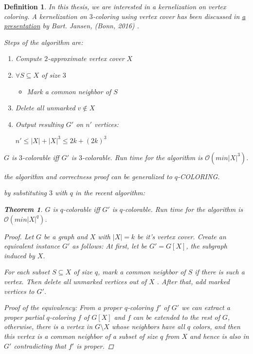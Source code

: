 \documentclass[12pt]{article}
\theoremstyle{slplain}
\newtheorem{theorem}{Theorem}
\newtheorem{defi}{Definition}
\begin{document}
\begin{defi}
In this thesis, we are interested in a kernelization on vertex coloring. 
A kernelization on $3$-coloring using vertex cover has been discussed in \href{https://onedrive.live.com/view.aspx?resid=D39E73028C0B20E6!2586&ithint=file%2cpptx&app=PowerPoint&authkey=!AFs8zyWC8bfQ0PA}{a presentation} by Bart. Jansen, (Bonn, 2016) \cite{bart}.

Steps of the algorithm are:

\begin{enumerate}
\item Compute $2$-approximate vertex cover $X$

\item $\forall S\subseteq X$ of size $3$
\begin{itemize}
\item Mark a common neighbor of $S$
\end{itemize}
\item Delete all unmarked $v \not\in X$

\item Output resulting $G'$ on $n'$ vertices:

\begin{center}
$n' \leq |X| + |X|^3 \leq 2k + (2k)^3$
\end{center}
\end{enumerate}

$G$ is $3$-colorable iff $G'$ is $3$-colorable. Run time for the algorithm is $\mathcal{O}(min|X|^3)$.

the algorithm and correctness proof can be generalized to $q$-COLORING. \cite{kra}


by substituting $3$ with $q$ in the recent algorithm:

\begin{theorem}{\label{main theorem}}
$G$ is $q$-colorable iff $G'$ is $q$-colorable. Run time for the algorithm
is $\mathcal{O}(min|X|^q)$.
\end{theorem}

\begin{proof}
Let $G$ be a graph and $X$ with $|X| = k$ be it's vertex cover. Create an
equivalent instance $G'$ as follows: At first, let be $G' = G[X]$,  the subgraph induced by $X$. 

For each subset
$S \subseteq X$ of size $q$, mark a common neighbor of $S$ if there is such a vertex.
Then delete all unmarked vertices out of $X$ . After that, add marked vertices to $G'$. 

Proof of the equivalency: From a proper $q$-coloring $f'$ of $G'$ we
can extract a proper partial $q$-coloring $f$ of $G[X]$ and $f$ can be extended to the rest of $G$, otherwise, there is a vertex in $G \setminus X$ whose neighbors have all $q$ colors, and then this vertex is a common neighbor of a subset of size $q$ from
$X$ and hence is also in $G'$ contradicting that $f'$ is proper.


\end{proof}
\end{defi}
\end{document}
